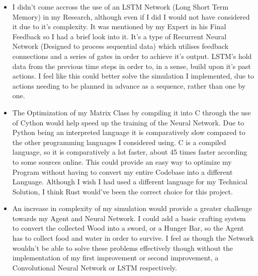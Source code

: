 \begin{flushleft}
\begin{itemize}
            \vspace{0.2cm}
            \item I didn't come accross the use of an LSTM Network (Long Short Term Memory) in my Research, although even if I did I would not have considered
            it due to it's complexity. It was mentioned by my Expert in his Final Feedback so I had a brief look into it. It's a type of Recurrent Neural Network 
            (Designed to process sequential data) which utilises feedback connections and a series of gates in order to achieve it's output. LSTM's hold 
            data from the previous time steps in order to, in a sense, build upon it's past actions. I feel like this could better solve the simulation 
            I implemented, due to actions needing to be planned in advance as a sequence, rather than one by one.
            
            \vspace{0.2cm}
            \item The Optimization of my Matrix Class by compiling it into C through the use of Cython would help speed up the training of the Neural
            Network. Due to Python being an interpreted language it is comparatively slow compared to the other programming languages I considered
            using. C is a compiled language, so it is comparatively a lot faster, about 45 times faster according to some sources online. This could
            provide an easy way to optimize my Program without having to convert my entire Codebase into a different Language. Although I wish I
            had used a different language for my Technical Solution, I think Rust would've been the correct choice for this project. \\

            \vspace{0.2cm}
            \item An increase in complexity of my simulation would provide a greater challenge towards my Agent and Neural Network. I could add a basic
            crafting system to convert the collected Wood into a sword, or a Hunger Bar, so the Agent has to collect food and water in order to survive.
            I feel as though the Network wouldn't be able to solve these problems effectively though without the implementation of my first improvement
            or second improvement, a Convolutional Neural Network or LSTM respectively. \\

            \vspace{0.2cm}
        \end{itemize}
\end{flushleft}